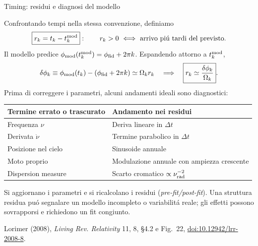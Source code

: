 \begin{frame}[t]{Timing: residui e diagnosi del modello}
\vspace*{3mm}
\small\raggedright
Confrontando tempi nella stessa convenzione, definiamo
\[
\boxed{r_k=t_k-t_k^{\rm mod}}:
\qquad r_k>0\ \Longleftrightarrow\ \text{arrivo pi\'u tardi del previsto}.
\]
Il modello predice $\phi_{\rm mod}(t_k^{\rm mod})=\phi_{\rm fid}+2\pi k$.
Espandendo attorno a $t_k^{\rm mod}$,
\[
\delta\phi_k\equiv\phi_{\rm mod}(t_k)-(\phi_{\rm fid}+2\pi k)
\simeq\Omega_k r_k
\quad\Longrightarrow\quad
\boxed{r_k\simeq\frac{\delta\phi_k}{\Omega_k}}.
\]
Prima di correggere i parametri, alcuni andamenti ideali sono diagnostici:
\par\smallskip
{\renewcommand{\arraystretch}{1.25}
\begin{tabular}{@{}p{}p{}@{}}
\hline
\textbf{Termine errato o trascurato} & \textbf{Andamento nei residui}\\
\hline
Frequenza $\nu$ & Deriva lineare in $\Delta t$\\
Derivata $\dot\nu$ & Termine parabolico in $\Delta t$\\
Posizione nel cielo & Sinusoide annuale\\
Moto proprio & Modulazione annuale con ampiezza crescente\\
Dispersion measure & Scarto cromatico $\propto\nu_{\rm rad}^{-2}$\\
\hline
\end{tabular}}
\par\smallskip
Si aggiornano i parametri e si ricalcolano i residui (\emph{pre-fit/post-fit}).
Una struttura residua pu\'o segnalare un modello incompleto o variabilit\'a reale;
gli effetti possono sovrapporsi e richiedono un fit congiunto.
\par\smallskip
\footnotesize
Lorimer (2008), \emph{Living Rev. Relativity} 11, 8, \S4.2 e Fig.~22,
\href{https://doi.org/10.12942/lrr-2008-8}{doi:10.12942/lrr-2008-8}.
\end{frame}

